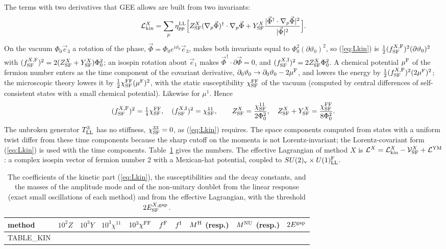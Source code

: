 \documentclass[aps,prd,onecolumn,superscriptaddress,nofootinbib,floatfix,longbibliography]{revtex4-2}
\newcommand{\LL}{{\rm LL}}
\newcommand{\SF}{{\rm SF}}
\begin{document}
The terms with two derivatives that GEE allows are built from two invariants:
\begin{equation}
\mathcal L^X_{\rm kin}=\sum_p\eta^\LL_{pp}\Big[Z^X_\SF(\nabla_p\vec\Phi)^\dagger\cdot\nabla_p\vec\Phi+Y^X_\SF\frac{|\vec\Phi^\dagger\cdot\nabla_p\vec\Phi|^2}{|\vec\Phi|^2}\Big].
\label{eq:Lkin}
\end{equation}
On the vacuum $\Phi_0\vec e_3$ a rotation of the phase, $\vec\Phi=\Phi_0e^{i\vartheta_0}\vec e_3$, makes both invariants equal to
$\Phi_0^2(\partial\vartheta_0)^2$, so (\ref{eq:Lkin}) is $\frac12(f^{X,{\rm F}}_\SF)^2(\partial\vartheta_0)^2$ with
$(f^{X,{\rm F}}_\SF)^2=2(Z^X_\SF+Y^X_\SF)\Phi_0^2$; an isospin rotation about $\vec e_1$ makes $\vec\Phi^\dagger\cdot\partial\vec\Phi=0$, and
$(f^{X,{\rm I}}_\SF)^2=2Z^X_\SF\Phi_0^2$. A chemical potential $\mu^{\rm F}$ of the fermion number enters as the time component of the
covariant derivative, $\partial_0\vartheta_0\to\partial_0\vartheta_0-2\mu^{\rm F}$, and lowers the energy by
$\frac12(f^{X,{\rm F}}_\SF)^2(2\mu^{\rm F})^2$; the microscopic theory lowers it by $\frac12\chi^{\rm FF}_\SF(\mu^{\rm F})^2$, with the static
susceptibility $\chi^{\rm FF}_\SF$ of the vacuum (computed by central differences of self-consistent states with a small chemical
potential). Likewise for $\mu^1$. Hence
\begin{equation}
(f^{X,{\rm F}}_\SF)^2=\tfrac14\chi^{\rm FF}_\SF,\quad(f^{X,{\rm I}}_\SF)^2=\chi^{11}_\SF,\qquad Z^X_\SF=\frac{\chi^{11}_\SF}{2\Phi_0^2},\quad Z^X_\SF+Y^X_\SF=\frac{\chi^{\rm FF}_\SF}{8\Phi_0^2}.
\label{eq:ZY}
\end{equation}
The unbroken generator $T^3_\LL$ has no stiffness, $\chi^{33}_\SF=0$, as (\ref{eq:Lkin}) requires. The space components
computed from states with a uniform twist differ from these time components because the sharp cutoff on the momenta is not
Lorentz-invariant; the Lorentz-covariant form (\ref{eq:Lkin}) is used with the time components. Table~\ref{tab:kin} gives the
numbers. The effective Lagrangian of method $X$ is $\mathcal L^X=\mathcal L^X_{\rm kin}-\mathcal V^X_\SF+\mathcal L^{\rm YM}$: a complex
isospin vector of fermion number 2 with a Mexican-hat potential, coupled to $SU(2)_{\rm v}\times U(1)^{\rm F}_\LL$.

\begin{table}[h]
\caption{\label{tab:kin}The coefficients of the kinetic part (\ref{eq:Lkin}), the susceptibilities and the decay constants, and the
masses of the amplitude mode and of the non-unitary doublet from the linear response (exact small oscillations of each method)
and from the effective Lagrangian, with the threshold $2E^{X,{\rm gap}}_\SF$.}
\begin{ruledtabular}
\begin{tabular}{lrrrrrrrrr}
method & $10^2Z$ & $10^3Y$ & $10^3\chi^{11}$ & $10^3\chi^{\rm FF}$ & $f^{\rm F}$ & $f^{\rm I}$ & $M^{\rm H}$ (resp.) & $M^{\rm NU}$ (resp.) & $2E^{\rm gap}$ \\
\hline
{{TABLE_KIN}}
\end{tabular}
\end{ruledtabular}
\end{table}
\end{document}
